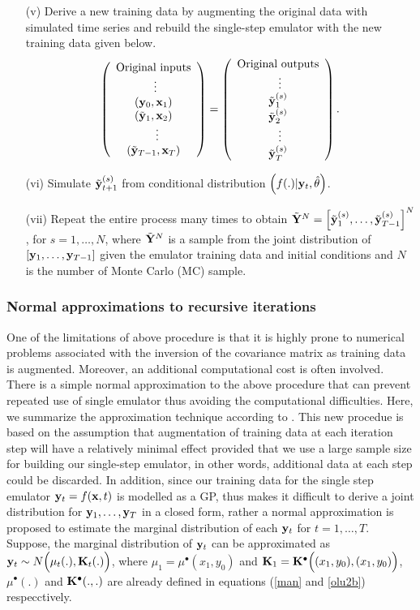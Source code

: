 \begin{itemize}
\item[{(v)}] Derive a new training data by augmenting the original data with simulated time series and rebuild the single-step emulator with the new training data given below. 
\[ 
\left( \begin{array}{ccc}
\mbox{Original inputs}\\
~\vdots \\
({\bf y}_0,{\bf x}_1)\\
({\tilde {\bf y}}_1,{\bf x}_2)\\
~~\vdots \\
({\tilde {\bf y}}_{T-1},{\bf x}_T) \end{array} \right)
 = 
\left( \begin{array}{ccc}
\mbox{Original outputs}\\
~\vdots \\
{\tilde {\bf y}}^{(s)}_1\\
{\tilde {\bf y}}^{(s)}_2 \\
~\vdots \\
{\tilde {\bf y}}^{(s)}_{T}\end{array} \right).
\] 
\item[{(vi)}] Simulate ${\tilde {\bf y}}^{(s)}_{t+1}$ from conditional distribution $\Big(f(.)|{\bf y}_t,\hat\theta\Big)$.  
\item[{(vii)}] Repeat the entire process many times to obtain ${\tilde {\bf Y}}^{N}=\Big[{\tilde {\bf y}}^{(s)}_1,\ldots,{\tilde {\bf y}}^{(s)}_{T-1}\Big]^N$, for $s=1,\ldots,N$, where ${\tilde {\bf Y}}^{N}$ is a sample from the joint distribution of $[{\bf y}_1,\ldots,{\bf y}_{T-1}]$ given the emulator training data and initial conditions and $N$ is the number of Monte Carlo (MC) sample.
\end{itemize}

\subsubsection{Normal approximations to recursive iterations}
One of the limitations of above procedure is that it is highly prone to numerical problems associated with the inversion of the covariance matrix as training data is augmented. Moreover, an additional computational cost is often involved. There is a simple normal approximation to the above procedure that can prevent repeated use of single emulator thus avoiding the computational difficulties.
Here, we summarize the approximation technique according to \citet{pd12}. This new procedue is based on the assumption that augmentation of training data at each iteration step will have a relatively minimal effect provided that we use a large sample size for building our single-step emulator, in other words, additional data at each step could be discarded. In addition, since our training data for the single step emulator ${\bf y}_t = f({\bf x},t)$ is modelled as a GP, thus makes it difficult to derive a joint distribution for ${\bf y}_1,\ldots,{\bf y}_T$ in a closed form, rather a normal approximation is proposed to estimate the marginal distribution of each ${\bf y}_t$ for $t=1,\ldots,T$. Suppose, the marginal distribution of ${\bf y}_t$ can be approximated as ${\bf y}_t \sim N\Big(\mu_t(.), {\mathbf{K}}_t(.)\Big)$, where $\mu_1 =\mu^{\bullet}(x_1,y_0)$ and ${\mathbf{K}}_1={\mathbf{K}}^{\bullet}\Big((x_1,y_0),(x_1,y_0)\Big)$, $\mu^{\bullet}(.)$ and ${\mathbf{K}}^{\bullet}(.,.)$ are already defined in equations (\ref{man} and \ref{olu2b}) respecctively.

